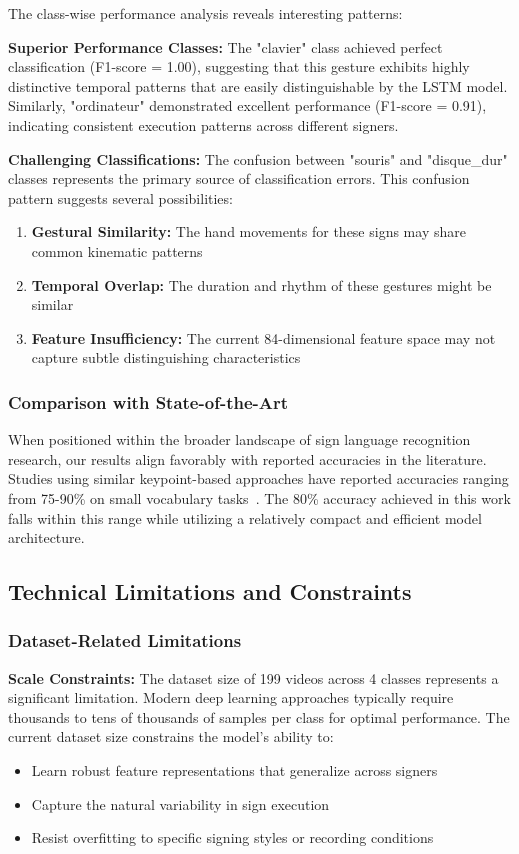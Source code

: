 \documentclass[11pt, a4paper]{article}
\begin{document}
The class-wise performance analysis reveals interesting patterns:

\textbf{Superior Performance Classes:}
The "clavier" class achieved perfect classification (F1-score = 1.00), suggesting that this gesture exhibits highly distinctive temporal patterns that are easily distinguishable by the LSTM model. Similarly, "ordinateur" demonstrated excellent performance (F1-score = 0.91), indicating consistent execution patterns across different signers.

\textbf{Challenging Classifications:}
The confusion between "souris" and "disque\_dur" classes represents the primary source of classification errors. This confusion pattern suggests several possibilities:
\begin{enumerate}
    \item \textbf{Gestural Similarity:} The hand movements for these signs may share common kinematic patterns
    \item \textbf{Temporal Overlap:} The duration and rhythm of these gestures might be similar
    \item \textbf{Feature Insufficiency:} The current 84-dimensional feature space may not capture subtle distinguishing characteristics
\end{enumerate}

\subsubsection{Comparison with State-of-the-Art}

When positioned within the broader landscape of sign language recognition research, our results align favorably with reported accuracies in the literature. Studies using similar keypoint-based approaches have reported accuracies ranging from 75-90\% on small vocabulary tasks~\cite{Camgoz20, Koller20}. The 80\% accuracy achieved in this work falls within this range while utilizing a relatively compact and efficient model architecture.

\subsection{Technical Limitations and Constraints}

\subsubsection{Dataset-Related Limitations}

\textbf{Scale Constraints:}
The dataset size of 199 videos across 4 classes represents a significant limitation. Modern deep learning approaches typically require thousands to tens of thousands of samples per class for optimal performance. The current dataset size constrains the model's ability to:
\begin{itemize}
    \item Learn robust feature representations that generalize across signers
    \item Capture the natural variability in sign execution
    \item Resist overfitting to specific signing styles or recording conditions
\end{itemize}
\end{document}
